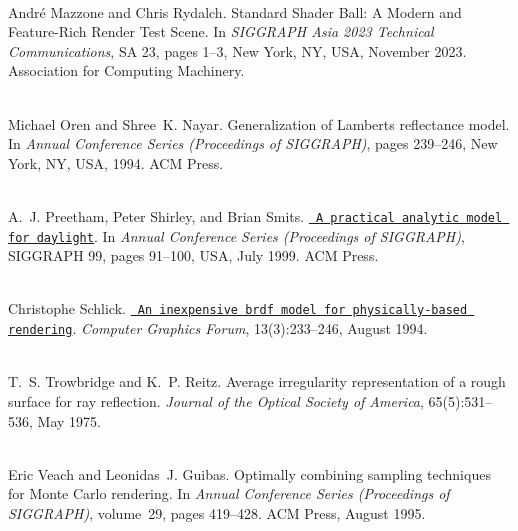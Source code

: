 \begin{DoxyDescription}
\item[\label{citelist_CITEREF_Mazzone:2023:Standard}%
\Hypertarget{citelist_CITEREF_Mazzone:2023:Standard}%
\mbox{[}13\mbox{]}]\hfill \\
Andr\'{e} Mazzone and Chris Rydalch. Standard Shader Ball\+: A Modern and Feature-\/\+Rich Render Test Scene. In {\itshape SIGGRAPH Asia 2023 Technical Communications}, SA \textquotesingle{}23, pages 1--3, New York, NY, USA, November 2023. Association for Computing Machinery. 


\item[\label{citelist_CITEREF_Oren:1994:Generalization}%
\Hypertarget{citelist_CITEREF_Oren:1994:Generalization}%
\mbox{[}14\mbox{]}]\hfill \\
Michael Oren and Shree~K. Nayar. Generalization of Lambert\textquotesingle{}s reflectance model. In {\itshape Annual Conference Series (Proceedings of SIGGRAPH)}, pages 239--246, New York, NY, USA, 1994. ACM Press. 


\item[\label{citelist_CITEREF_Preetham:1999:Practical}%
\Hypertarget{citelist_CITEREF_Preetham:1999:Practical}%
\mbox{[}15\mbox{]}]\hfill \\
A.~J. Preetham, Peter Shirley, and Brian Smits. \href{https://doi.org/10.1145/311535.311545}{\texttt{ A practical analytic model for daylight}}. In {\itshape Annual Conference Series (Proceedings of SIGGRAPH)}, SIGGRAPH \textquotesingle{}99, pages 91--100, USA, July 1999. ACM Press. 


\item[\label{citelist_CITEREF_Schlick:1994:BRDF}%
\Hypertarget{citelist_CITEREF_Schlick:1994:BRDF}%
\mbox{[}16\mbox{]}]\hfill \\
Christophe Schlick. \href{https://onlinelibrary.wiley.com/doi/abs/10.1111/1467-8659.1330233}{\texttt{ An inexpensive brdf model for physically-\/based rendering}}. {\itshape Computer Graphics Forum}, 13(3)\+:233--246, August 1994. 


\item[\label{citelist_CITEREF_Trowbridge:1975:Average}%
\Hypertarget{citelist_CITEREF_Trowbridge:1975:Average}%
\mbox{[}17\mbox{]}]\hfill \\
T.~S. Trowbridge and K.~P. Reitz. Average irregularity representation of a rough surface for ray reflection. {\itshape Journal of the Optical Society of America}, 65(5)\+:531--536, May 1975. 


\item[\label{citelist_CITEREF_Veach:1995:Optimally}%
\Hypertarget{citelist_CITEREF_Veach:1995:Optimally}%
\mbox{[}18\mbox{]}]\hfill \\
Eric Veach and Leonidas~J. Guibas. Optimally combining sampling techniques for Monte Carlo rendering. In {\itshape Annual Conference Series (Proceedings of SIGGRAPH)}, volume~29, pages 419--428. ACM Press, August 1995. 



\end{DoxyDescription}
